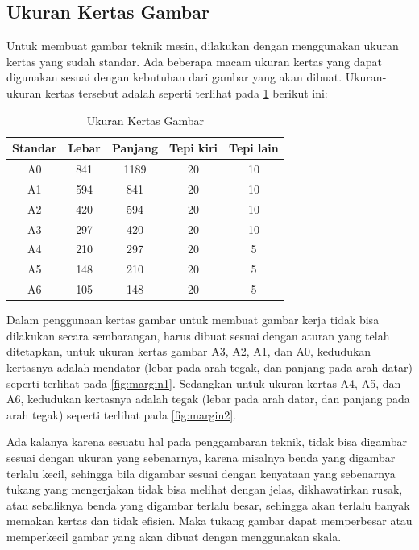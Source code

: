 \documentclass[11pt]{simart} %
\begin{document}
\subsection{Ukuran Kertas Gambar}%
\label{sub:Ukuran Kertas Gambar}

Untuk membuat gambar teknik mesin, dilakukan dengan menggunakan ukuran kertas yang sudah standar. Ada beberapa macam ukuran kertas yang dapat digunakan sesuai dengan kebutuhan dari gambar yang akan dibuat. Ukuran- ukuran kertas tersebut adalah seperti terlihat pada \ref{tab:tab1} berikut ini:

\begin{table}[htb]
	\caption{Ukuran Kertas Gambar}
	\label{tab:tab1}
	\begin{tabularx}{\textwidth}{|c|c|c|c|c|}
		\hline
		Standar  &  Lebar  &  Panjang  &  Tepi kiri  &  Tepi lain  \\
		\hline
		A0       &  841    &  1189     &  20         &  10  \\
		A1       &  594    &  841      &  20         &  10  \\
		A2       &  420    &  594      &  20         &  10  \\
		A3       &  297    &  420      &  20         &  10  \\
		A4       &  210    &  297      &  20         &  5  \\
		A5       &  148    &  210      &  20         &  5  \\
		A6       &  105    &  148      &  20         &  5  \\
		\hline
	\end{tabularx}
\end{table}


Dalam penggunaan kertas gambar untuk membuat gambar kerja tidak bisa dilakukan secara sembarangan, harus dibuat sesuai dengan aturan yang telah ditetapkan, untuk ukuran kertas gambar A3, A2, A1, dan A0, kedudukan kertasnya adalah mendatar (lebar pada arah tegak, dan panjang pada arah datar) seperti terlihat pada \ref{fig:margin1}. Sedangkan untuk ukuran kertas A4, A5, dan A6, kedudukan kertasnya adalah tegak (lebar pada arah datar, dan panjang pada arah tegak) seperti terlihat pada \ref{fig:margin2}.

Ada kalanya karena sesuatu hal pada penggambaran teknik, tidak bisa digambar sesuai dengan ukuran yang sebenarnya, karena misalnya benda yang digambar terlalu kecil, sehingga bila digambar sesuai dengan kenyataan yang sebenarnya tukang yang mengerjakan tidak bisa melihat dengan jelas, dikhawatirkan rusak, atau sebaliknya benda yang digambar terlalu besar, sehingga akan terlalu banyak memakan kertas dan tidak efisien. Maka tukang gambar dapat memperbesar atau memperkecil gambar yang akan dibuat dengan menggunakan skala.
\end{document}
